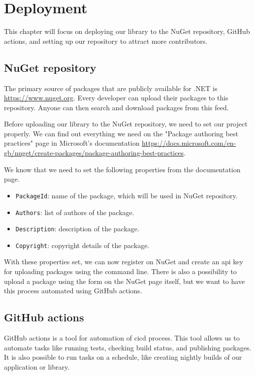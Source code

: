 \chapter {Deployment}

This chapter will focus on deploying our library to the NuGet repository, GitHub actions, and setting up our repository to attract more contributors.

\section {NuGet repository}

The primary source of packages that are publicly available for .NET is \url{https://www.nuget.org}. Every developer can
upload their packages to this repository. Anyone can then search and download packages from this feed.

Before uploading our library to the NuGet repository, we need to set our project properly. We can find out
everything we need on the "Package authoring best practices" page in Microsoft's documentation
\url{https://docs.microsoft.com/en-gb/nuget/create-packages/package-authoring-best-practices}.

We know that we need to set the following properties from the documentation page.

\begin{itemize}
    \item \texttt{PackageId}: name of the package, which will be used in NuGet repository.
    \item \texttt{Authors}: list of authors of the package.
    \item \texttt{Description}: description of the package.
    \item \texttt{Copyright}: copyright details of the package.
\end{itemize}

With these properties set, we can now register on NuGet and create an \acrshort{api} key for uploading packages
using the command line. There is also a possibility to upload a package using the form on the NuGet page itself, but we want to
have this process automated using GitHub actions.

\section{GitHub actions}

GitHub actions is a tool for automation of \acrfull{cicd} process. This tool allows us to automate tasks like
running tests, checking build status, and publishing packages. It is also possible to run tasks on a schedule, like creating nightly
builds of our application or library.

